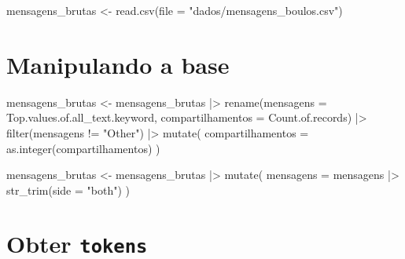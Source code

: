 \documentclass[
  12pt,
]{report}
\newenvironment{Shaded}{\begin{snugshade}}{\end{snugshade}}
\newcommand{\AttributeTok}[1]{\textcolor[rgb]{0.40,0.45,0.13}{#1}}
\newcommand{\CommentTok}[1]{\textcolor[rgb]{0.37,0.37,0.37}{#1}}
\newcommand{\FunctionTok}[1]{\textcolor[rgb]{0.28,0.35,0.67}{#1}}
\newcommand{\NormalTok}[1]{\textcolor[rgb]{0.00,0.23,0.31}{#1}}
\newcommand{\OtherTok}[1]{\textcolor[rgb]{0.00,0.23,0.31}{#1}}
\newcommand{\SpecialCharTok}[1]{\textcolor[rgb]{0.37,0.37,0.37}{#1}}
\newcommand{\StringTok}[1]{\textcolor[rgb]{0.13,0.47,0.30}{#1}}
\begin{document}
\begin{Shaded}
\begin{Highlighting}[]
\NormalTok{mensagens\_brutas }\OtherTok{\textless{}{-}} \FunctionTok{read.csv}\NormalTok{(}\AttributeTok{file =} \StringTok{"dados/mensagens\_boulos.csv"}\NormalTok{)}
\end{Highlighting}
\end{Shaded}

\section{Manipulando a base}\label{manipulando-a-base}

\begin{Shaded}
\begin{Highlighting}[]
\NormalTok{mensagens\_brutas }\OtherTok{\textless{}{-}}\NormalTok{ mensagens\_brutas }\SpecialCharTok{|\textgreater{}} 
  \FunctionTok{rename}\NormalTok{(}\AttributeTok{mensagens =}\NormalTok{ Top.values.of.all\_text.keyword,}
         \AttributeTok{compartilhamentos =}\NormalTok{ Count.of.records) }\SpecialCharTok{|\textgreater{}} 
  \FunctionTok{filter}\NormalTok{(mensagens }\SpecialCharTok{!=} \StringTok{"Other"}\NormalTok{) }\SpecialCharTok{|\textgreater{}} 
  \FunctionTok{mutate}\NormalTok{(}
    \AttributeTok{compartilhamentos =} \FunctionTok{as.integer}\NormalTok{(compartilhamentos)}
\NormalTok{  )}

\NormalTok{mensagens\_brutas }\OtherTok{\textless{}{-}}\NormalTok{ mensagens\_brutas }\SpecialCharTok{|\textgreater{}}
  \FunctionTok{mutate}\NormalTok{(}
    \AttributeTok{mensagens =}\NormalTok{ mensagens }\SpecialCharTok{|\textgreater{}} \FunctionTok{str\_trim}\NormalTok{(}\AttributeTok{side =} \StringTok{"both"}\NormalTok{)}
\NormalTok{  )}
\end{Highlighting}
\end{Shaded}

\section{\texorpdfstring{Obter
\texttt{tokens}}{Obter tokens}}\label{obter-tokens}

\begin{Shaded}
\end{Shaded}
\end{document}
